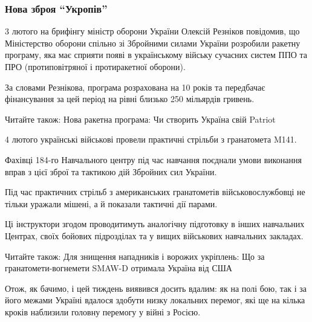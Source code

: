 \subsubsection{Нова зброя \enquote{Укропів}}

3 лютого на брифінгу міністр оборони України Олексій Резніков повідомив, що
Міністерство оборони спільно зі Збройними силами України розробили ракетну
програму, яка має сприяти появі в українському війську сучасних систем ППО та
ПРО (протиповітряної і протиракетної оборони).

За словами Резнікова, програма розрахована на 10 років та передбачає
фінансування за цей період на рівні близько 250 мільярдів гривень.

Читайте також: Нова ракетна програма: Чи створить Україна свій Patriot

4 лютого українські військові провели практичні стрільби з гранатомета M141.

Фахівці 184-го Навчального центру під час навчання поєднали умови виконання
вправ з цієї зброї та тактикою дій Збройних сил України.

Під час практичних стрільб з американських гранатометів військовослужбовці не
тільки уражали мішені, а й показали тактичні дії парами.

Ці інструктори згодом проводитимуть аналогічну підготовку в інших навчальних
Центрах, своїх бойових підрозділах та у вищих військових навчальних закладах.

Читайте також: Для знищення нападників і ворожих укріплень: Що за
гранатомети-вогнемети SMAW-D отримала Україна від США

Отож, як бачимо, і цей тиждень виявився досить вдалим: як на полі бою, так і за
його межами Україні вдалося здобути низку локальних перемог, які ще на кілька
кроків наблизили головну перемогу у війні з Росією.
